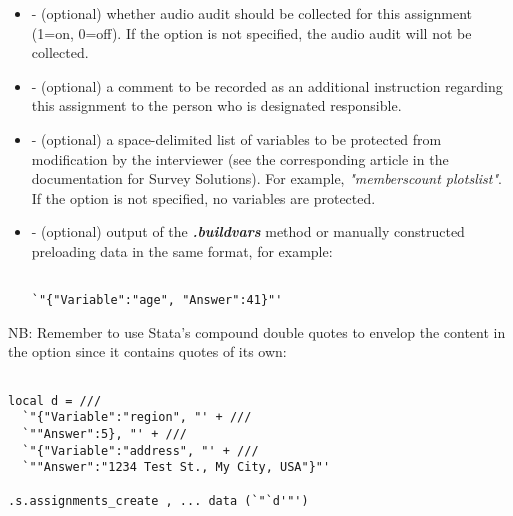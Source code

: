 \begin{itemize}
\item {} - (optional) whether audio audit should be collected for
      this assignment (1=on, 0=off). If the option is not specified, the audio
      audit will not be collected.

\item {} - (optional) a comment to be recorded as an additional
      instruction regarding this assignment to the person who is designated
      responsible.

\item {} - (optional) a space-delimited list of variables to
      be protected from modification by the interviewer (see the corresponding
      article in the documentation for Survey Solutions). For example,
      \textit{"memberscount plotslist"}. If the option is not specified, no
      variables are protected.

\item {} - (optional) output of the \textit{\textbf{.buildvars}}
      method or manually constructed preloading data in the same format, for
      example:
\begin{lstlisting}[style=CommandLineStyle, showlines=true]

`"{"Variable":"age", "Answer":41}"'

\end{lstlisting}

\end{itemize}


NB: Remember to use Stata's compound double quotes to envelop the content in
the  option since it contains quotes of its own:

\begin{lstlisting}[style=CommandLineStyle, showlines=true]

local d = ///
  `"{"Variable":"region", "' + ///
  `""Answer":5}, "' + ///
  `"{"Variable":"address", "' + ///
  `""Answer":"1234 Test St., My City, USA"}"'

.s.assignments_create , ... data (`"`d'"')

\end{lstlisting}


